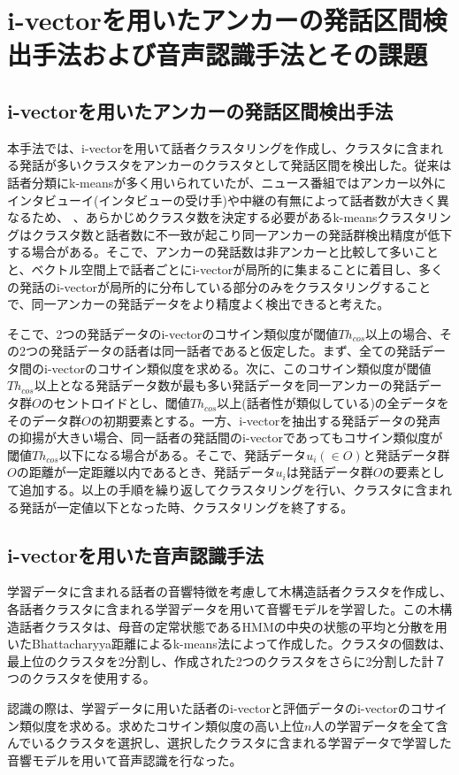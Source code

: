 \chapter{i-vectorを用いたアンカーの発話区間検出手法および音声認識手法とその課題}

\section{i-vectorを用いたアンカーの発話区間検出手法\cite{nozaki_gakuseikai}}
\label{section:clustering}
本手法では、i-vectorを用いて話者クラスタリングを作成し、クラスタに含まれる発話が多いクラスタをアンカーのクラスタとして発話区間を検出した。従来は話者分類にk-meansが多く用いられていたが、ニュース番組ではアンカー以外にインタビューイ(インタビューの受け手)や中継の有無によって話者数が大きく異なるため、
、あらかじめクラスタ数を決定する必要があるk-meansクラスタリングはクラスタ数と話者数に不一致が起こり同一アンカーの発話群検出精度が低下する場合がある。そこで、アンカーの発話数は非アンカーと比較して多いことと、ベクトル空間上で話者ごとにi-vectorが局所的に集まることに着目し、多くの発話のi-vectorが局所的に分布している部分のみをクラスタリングすることで、同一アンカーの発話データをより精度よく検出できると考えた。\par
そこで、2つの発話データのi-vectorのコサイン類似度が閾値$Th_{cos}$以上の場合、その2つの発話データの話者は同一話者であると仮定した。まず、全ての発話データ間のi-vectorのコサイン類似度を求める。次に、このコサイン類似度が閾値$Th_{cos}$以上となる発話データ数が最も多い発話データを同一アンカーの発話データ群$O$のセントロイドとし、閾値$Th_{cos}$以上(話者性が類似している)の全データをそのデータ群$O$の初期要素とする。一方、i-vectorを抽出する発話データの発声の抑揚が大きい場合、同一話者の発話間のi-vectorであってもコサイン類似度が閾値$Th_{cos}$以下になる場合がある。そこで、発話データ$u_i(\in O)$と発話データ群$O$の距離が一定距離以内であるとき、発話データ$u_i$は発話データ群$O$の要素として追加する。以上の手順を繰り返してクラスタリングを行い、クラスタに含まれる発話が一定値以下となった時、クラスタリングを終了する。\par

\section{i-vectorを用いた音声認識手法\cite{yoshimura_clustering}}
\label{section:yoshimura_pre_clustering}
学習データに含まれる話者の音響特徴を考慮して木構造話者クラスタを作成し、各話者クラスタに含まれる学習データを用いて音響モデルを学習した。この木構造話者クラスタは、母音の定常状態であるHMMの中央の状態の平均と分散を用いたBhattacharyya距離によるk-means法によって作成した。クラスタの個数は、最上位のクラスタを2分割し、作成された2つのクラスタをさらに2分割した計７つのクラスタを使用する。\par
認識の際は、学習データに用いた話者のi-vectorと評価データのi-vectorのコサイン類似度を求める。求めたコサイン類似度の高い上位$n$人の学習データを全て含んでいるクラスタを選択し、選択したクラスタに含まれる学習データで学習した音響モデルを用いて音声認識を行なった。\par

